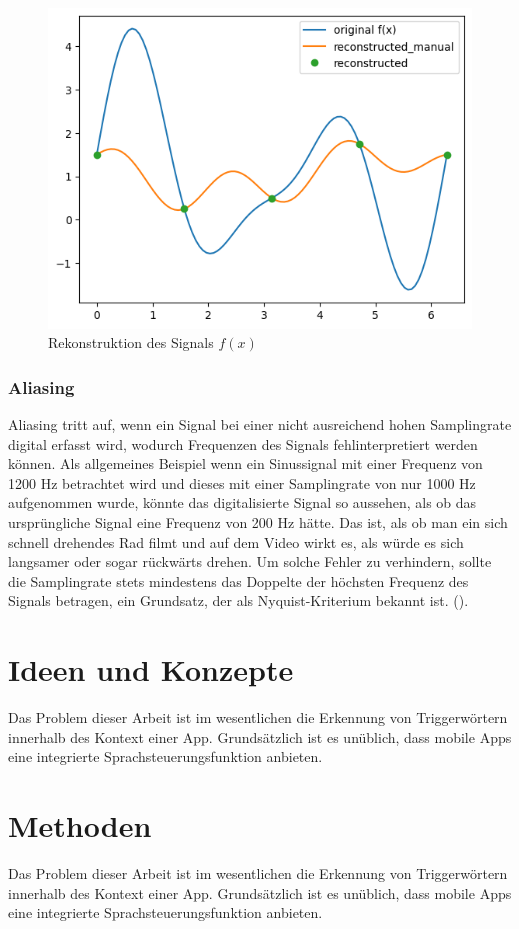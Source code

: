 \documentclass[11pt,a4paper]{article}
\begin{document}
\begin{figure}[h]
    \centering
    \includegraphics[width=0.60\linewidth]{img/dft_reconstructed.png}
    \caption{Rekonstruktion des Signals \(f(x)\)}
    \label{fig:dft_example_reconstructed}
\end{figure}

\subsubsection{Aliasing}
Aliasing tritt auf, wenn ein Signal bei einer nicht ausreichend hohen Samplingrate digital erfasst 
wird, wodurch Frequenzen des Signals fehlinterpretiert werden können. Als allgemeines Beispiel wenn 
ein Sinussignal mit einer Frequenz von 1200 Hz betrachtet wird und dieses mit einer Samplingrate 
von nur 1000 Hz aufgenommen wurde, könnte das digitalisierte Signal so aussehen, als ob das 
ursprüngliche Signal eine Frequenz von 200 Hz hätte. Das ist, als ob man ein sich schnell 
drehendes Rad filmt und auf dem Video wirkt es, als würde es sich langsamer oder sogar rückwärts 
drehen. Um solche Fehler zu verhindern, sollte die Samplingrate stets mindestens das 
Doppelte der höchsten Frequenz des Signals betragen, ein Grundsatz, der als Nyquist-Kriterium 
bekannt ist. (\cite[]{weitz2023fourier}).


\newpage
\section{Ideen und Konzepte}
Das Problem dieser Arbeit ist im wesentlichen die Erkennung von Triggerwörtern innerhalb
des Kontext einer App. Grundsätzlich ist es unüblich, dass mobile Apps eine
integrierte Sprachsteuerungsfunktion anbieten.


\newpage
\section{Methoden}
Das Problem dieser Arbeit ist im wesentlichen die Erkennung von Triggerwörtern innerhalb
des Kontext einer App. Grundsätzlich ist es unüblich, dass mobile Apps eine
integrierte Sprachsteuerungsfunktion anbieten.
\end{document}
